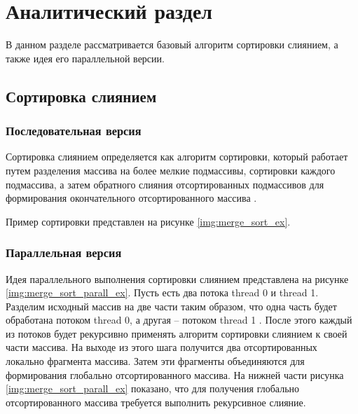 \chapter{Аналитический раздел}
В данном разделе рассматривается базовый алгоритм сортировки слиянием, а также идея его параллельной версии. 
\section{Сортировка слиянием}
\subsection{Последовательная версия}
Сортировка слиянием определяется как алгоритм сортировки, который работает путем разделения массива на более мелкие подмассивы, сортировки каждого подмассива, а затем обратного слияния отсортированных подмассивов для формирования окончательного отсортированного массива \cite{seq_sort}.

Пример сортировки представлен на рисунке \ref{img:merge_sort_ex}.

\subsection{Параллельная версия}
Идея параллельного выполнения сортировки слиянием представлена на рисунке \ref{img:merge_sort_parall_ex}.
Пусть есть два потока thread 0 и thread 1. Разделим исходный массив на две части таким образом, что одна часть будет обработана потоком thread 0, а другая -- потоком thread 1 \cite{parall_sort}. После этого каждый из потоков будет рекурсивно применять алгоритм сортировки слиянием к своей части массива. На выходе из этого шага получится два отсортированных локально фрагмента массива. Затем эти фрагменты объединяются для формирования глобально отсортированного массива. На нижней части рисунка \ref{img:merge_sort_parall_ex} показано, что для получения глобально отсортированного массива требуется выполнить рекурсивное слияние.

